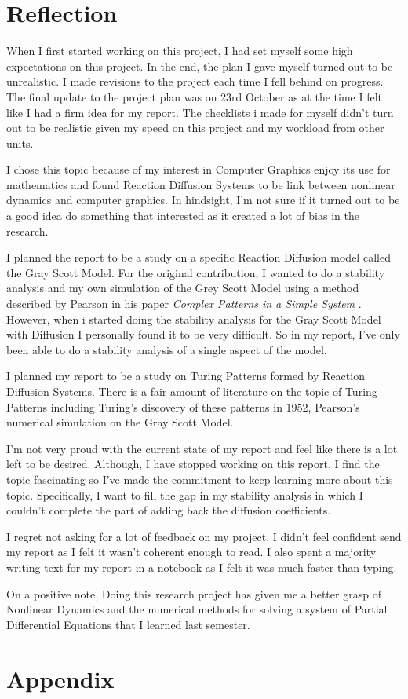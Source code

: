 \documentclass[a4paper, 11pt]{article}
\begin{document}
\pagebreak
\section{Reflection}
When I first started working on this project, I had set myself some high expectations on this project. In the end, the plan I gave myself turned out to be unrealistic. I made revisions to the project each time I fell behind on progress. The final update to the project plan was on 23rd October as at the time I felt like I had a firm idea for my report. The checklists i made for myself didn't turn out to be realistic given my speed on this project and my workload from other units. 

I chose this topic because of my interest in Computer Graphics enjoy its use for mathematics and found Reaction Diffusion Systems to be link between nonlinear dynamics and computer graphics. In hindsight, I'm not sure if it turned out to be a good idea do something that interested as it created a lot of bias in the research.   

I planned the report to be a study on a specific Reaction Diffusion model called the Gray Scott Model. For the original contribution, I wanted to do a stability analysis and my own simulation of the Grey Scott Model using a method described by Pearson in his paper \textit{Complex Patterns in a Simple System} \parencite{pearson1993}. However, when i started doing the stability analysis for the Gray Scott Model with Diffusion I personally found it to be very difficult. So in my report, I’ve only been able to do a stability analysis of a single aspect of the model. 


I planned my report to be a study on Turing Patterns formed by Reaction Diffusion Systems. There is a fair amount of literature on the topic of Turing Patterns including Turing's discovery of these patterns in 1952, Pearson's numerical simulation \parencite{pearson1993} on the Gray Scott Model.   


I’m not very proud with the current state of my report and feel like there is a lot left to be desired. Although, I have stopped working on this report. I find the topic fascinating so I've made the commitment to keep learning more about this topic. Specifically, I want to fill the gap in my stability analysis in which I couldn't complete the part of adding back the diffusion coefficients. 

I regret not asking for a lot of feedback on my project. I didn't feel confident send my report as I felt it wasn't coherent enough to read. I also spent a majority writing text for my report in a notebook as I felt it was much faster than typing. 

On a positive note, Doing this research project has given me a better grasp of Nonlinear Dynamics and the numerical methods for solving a system of Partial Differential Equations that I learned last semester. 

\section{Appendix}
\end{document}
